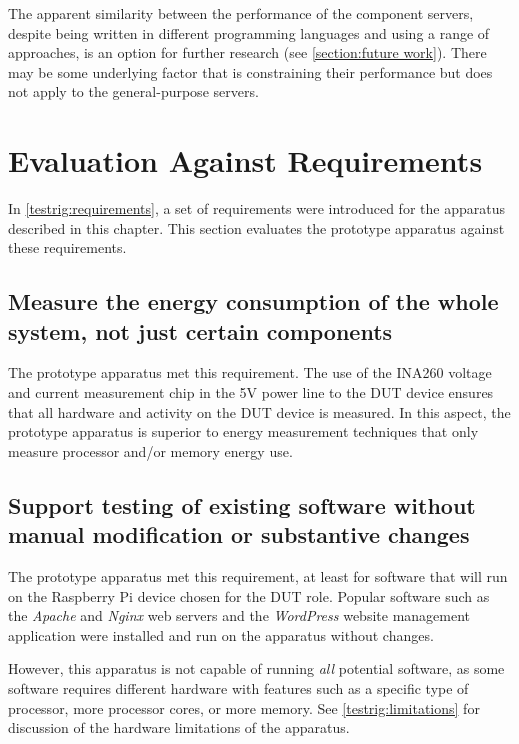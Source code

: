 The apparent similarity between the performance of the component servers, despite being written in different \gls{programming language}s and using a range of approaches, is an option for further research (see \autoref{section:future work}). There may be some underlying factor that is constraining their performance but does not apply to the general-purpose servers.

\section{Evaluation Against Requirements}
\label{testrig:evaluation}

In \autoref{testrig:requirements}, a set of requirements were introduced for the apparatus described in this chapter. This section evaluates the prototype apparatus against these requirements.

\subsection{Measure the energy consumption of the whole system, not just certain components}

The prototype apparatus met this requirement. The use of the INA260 voltage and current measurement chip in the 5V power line to the DUT device ensures that all hardware and activity on the DUT device is measured. In this aspect, the prototype apparatus is superior to energy measurement techniques that only measure processor and/or memory energy use.

\subsection{Support testing of existing software without manual modification or substantive changes}

The prototype apparatus met this requirement, at least for software that will run on the Raspberry Pi device chosen for the DUT role. Popular software such as the \emph{Apache} and \emph{Nginx} web servers and the \emph{WordPress} website management application were installed and run on the apparatus without changes.

However, this apparatus is not capable of running \emph{all} potential software, as some software requires different hardware with features such as a specific type of processor, more processor cores, or more memory. See \autoref{testrig:limitations} for discussion of the hardware limitations of the apparatus.

